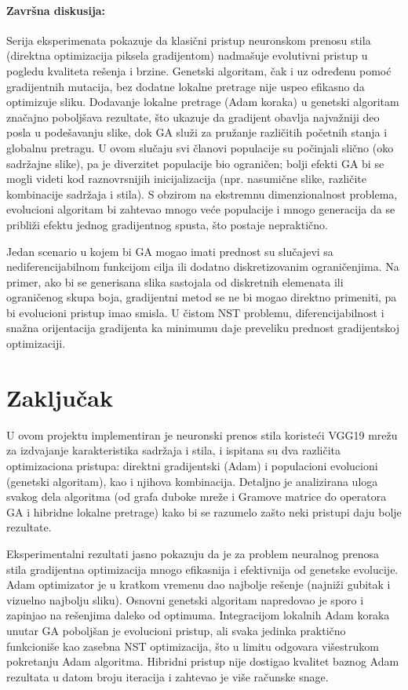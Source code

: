 \documentclass[a4paper,12pt]{article}
\begin{document}
\paragraph{Završna diskusija:} Serija eksperimenata pokazuje da klasični pristup neuronskom prenosu stila (direktna optimizacija piksela gradijentom) nadmašuje evolutivni pristup u pogledu kvaliteta rešenja i brzine. Genetski algoritam, čak i uz određenu pomoć gradijentnih mutacija, bez dodatne lokalne pretrage nije uspeo efikasno da optimizuje sliku. Dodavanje lokalne pretrage (Adam koraka) u genetski algoritam značajno poboljšava rezultate, što ukazuje da gradijent obavlja najvažniji deo posla u podešavanju slike, dok GA služi za pružanje različitih početnih stanja i globalnu pretragu. U ovom slučaju svi članovi populacije su počinjali slično (oko sadržajne slike), pa je diverzitet populacije bio ograničen; bolji efekti GA bi se mogli videti kod raznovrsnijih inicijalizacija (npr. nasumične slike, različite kombinacije sadržaja i stila). S obzirom na ekstremnu dimenzionalnost problema, evolucioni algoritam bi zahtevao mnogo veće populacije i mnogo generacija da se približi efektu jednog gradijentnog spusta, što postaje nepraktično.

Jedan scenario u kojem bi GA mogao imati prednost su slučajevi sa nediferencijabilnom funkcijom cilja ili dodatno diskretizovanim ograničenjima. Na primer, ako bi se generisana slika sastojala od diskretnih elemenata ili ograničenog skupa boja, gradijentni metod se ne bi mogao direktno primeniti, pa bi evolucioni pristup imao smisla. U čistom NST problemu, diferencijabilnost i snažna orijentacija gradijenta ka minimumu daje preveliku prednost gradijentskoj optimizaciji.

\section{Zaključak}
U ovom projektu implementiran je neuronski prenos stila koristeći VGG19 mrežu za izdvajanje karakteristika sadržaja i stila, i ispitana su dva različita optimizaciona pristupa: direktni gradijentski (Adam) i populacioni evolucioni (genetski algoritam), kao i njihova kombinacija. Detaljno je analizirana uloga svakog dela algoritma (od grafa duboke mreže i Gramove matrice do operatora GA i hibridne lokalne pretrage) kako bi se razumelo zašto neki pristupi daju bolje rezultate.

Eksperimentalni rezultati jasno pokazuju da je za problem neuralnog prenosa stila gradijentna optimizacija mnogo efikasnija i efektivnija od genetske evolucije. Adam optimizator je u kratkom vremenu dao najbolje rešenje (najniži gubitak i vizuelno najbolju sliku). Osnovni genetski algoritam napredovao je sporo i zapinjao na rešenjima daleko od optimuma. Integracijom lokalnih Adam koraka unutar GA poboljšan je evolucioni pristup, ali svaka jedinka praktično funkcioniše kao zasebna NST optimizacija, što u limitu odgovara višestrukom pokretanju Adam algoritma. Hibridni pristup nije dostigao kvalitet baznog Adam rezultata u datom broju iteracija i zahtevao je više računske snage.
\end{document}
